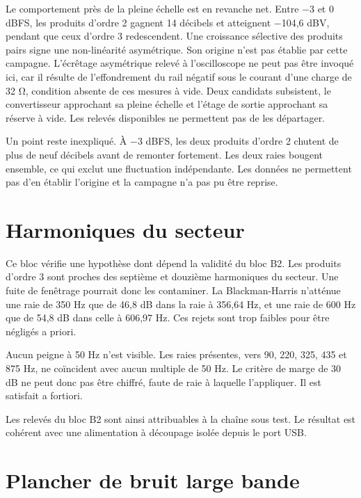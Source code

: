 Le comportement près de la pleine échelle est en revanche net. Entre $-$3 et 0 dBFS, les produits d'ordre 2 gagnent 14 décibels et atteignent $-$104,6 dBV, pendant que ceux d'ordre 3 redescendent. Une croissance sélective des produits pairs signe une non-linéarité asymétrique. Son origine n'est pas établie par cette campagne. L'écrêtage asymétrique relevé à l'oscilloscope ne peut pas être invoqué ici, car il résulte de l'effondrement du rail négatif sous le courant d'une charge de 32 Ω, condition absente de ces mesures à vide. Deux candidats subsistent, le convertisseur approchant sa pleine échelle et l'étage de sortie approchant sa réserve à vide. Les relevés disponibles ne permettent pas de les départager.

Un point reste inexpliqué. À $-$3 dBFS, les deux produits d'ordre 2 chutent de plus de neuf décibels avant de remonter fortement. Les deux raies bougent ensemble, ce qui exclut une fluctuation indépendante. Les données ne permettent pas d'en établir l'origine et la campagne n'a pas pu être reprise.

\section{Harmoniques du secteur}
\label{ann:imd:b31}

Ce bloc vérifie une hypothèse dont dépend la validité du bloc B2. Les produits d'ordre 3 sont proches des septième et douzième harmoniques du secteur. Une fuite de fenêtrage pourrait donc les contaminer. La Blackman-Harris n'atténue une raie de 350 Hz que de 46,8 dB dans la raie à 356,64 Hz, et une raie de 600 Hz que de 54,8 dB dans celle à 606,97 Hz. Ces rejets sont trop faibles pour être négligés a priori.


Aucun peigne à 50 Hz n'est visible. Les raies présentes, vers 90, 220, 325, 435 et 875 Hz, ne coïncident avec aucun multiple de 50 Hz. Le critère de marge de 30 dB ne peut donc pas être chiffré, faute de raie à laquelle l'appliquer. Il est satisfait a fortiori.

Les relevés du bloc B2 sont ainsi attribuables à la chaîne sous test. Le résultat est cohérent avec une alimentation à découpage isolée depuis le port USB.

\section{Plancher de bruit large bande}
\label{ann:imd:b32}

